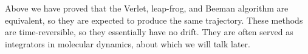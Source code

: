 Above we have proved that the Verlet, leap-frog, and Beeman algorithm are equivalent,
so they are expected to produce the same trajectory.
These methods are time-reversible, so they essentially have no drift. They are often
served as integrators in molecular dynamics, about which we will talk later.